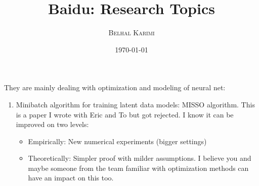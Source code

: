 \documentclass[11pt]{article}
\title{Baidu: Research Topics}
\author{%
\textsc{Belhal Karimi}\\
}
\date{\today} %
\theoremstyle{plain}
\theoremstyle{plain}
\theoremstyle{definition}
\begin{document}
\maketitle


They are mainly dealing with optimization and modeling of neural net:
\begin{enumerate}
\item Minibatch algorithm for training latent data models: MISSO algorithm. This is a paper I wrote with Eric and To but got rejected. I know it can be improved on two levels:
\begin{itemize}
\item Empirically: New numerical experiments (bigger settings)
\item Theoretically: Simpler proof with milder assumptions.
I believe you and maybe someone from the team familiar with optimization methods can have an impact on this too.
\end{itemize}


\end{enumerate}
\end{document}
